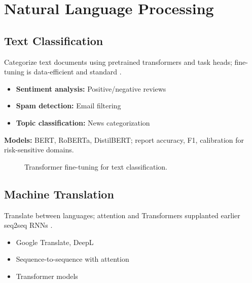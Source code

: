 
\section{Natural Language Processing}
\label{sec:nlp-applications}

\subsection{Text Classification}

Categorize text documents using pretrained transformers and task heads; fine-tuning is data-efficient and standard \textcite{Devlin2018,Prince2023,D2LChapterAttention}.
\begin{itemize}
    \item \textbf{Sentiment analysis:} Positive/negative reviews
    \item \textbf{Spam detection:} Email filtering
    \item \textbf{Topic classification:} News categorization
\end{itemize}

\textbf{Models:} BERT, RoBERTa, DistilBERT; report accuracy, F1, calibration for risk-sensitive domains.

\begin{figure}[h]
  \centering
  \caption{Transformer fine-tuning for text classification.}
  \label{fig:nlp-class}
\end{figure}

\subsection{Machine Translation}

Translate between languages; attention and Transformers supplanted earlier seq2seq RNNs \textcite{Bahdanau2014,Vaswani2017,GoodfellowEtAl2016,D2LChapterAttention}.
\begin{itemize}
    \item Google Translate, DeepL
    \item Sequence-to-sequence with attention
    \item Transformer models
\end{itemize}

